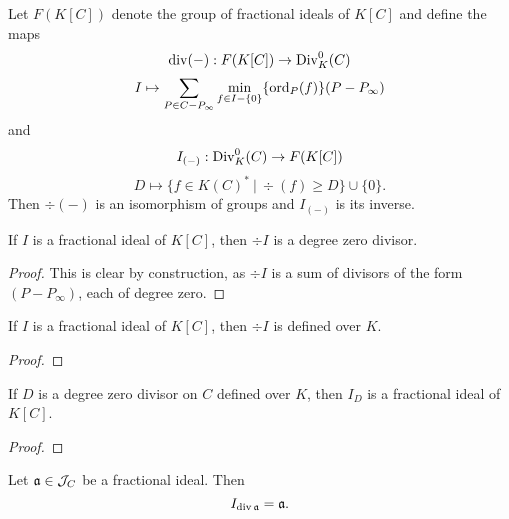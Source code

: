 \begin{theorem}
  Let $F(K[C])$ denote the group of fractional ideals of $K[C]$ and define the maps
  \[ \div(-) : F(K[C]) \to \Div_K^0(C) \]
  \[ I \mapsto \sum_{P \in C - P_\infty} \min_{f \in I - \{0\}}\{\ord_P(f)\}(P - P_\infty) \]
  and
  \[ I_{(-)} : \Div_K^0(C) \to F(K[C]) \]
  \[ D \mapsto \{ f \in K(C)^* ~|~ \div(f) \geq D \} \cup \{ 0 \}. \]
  Then $\div(-)$ is an isomorphism of groups and $I_{(-)}$ is its inverse.
\end{theorem}
\begin{lemma}
  If $I$ is a fractional ideal of $K[C]$, then $\div I$ is a degree zero divisor.
\end{lemma}
\begin{proof}
  This is clear by construction,
  as $\div I$ is a sum of divisors of the form $(P - P_\infty)$,
  each of degree zero.
\end{proof}
\begin{lemma}
  If $I$ is a fractional ideal of $K[C]$, then $\div I$ is defined over $K$.
\end{lemma}
\begin{proof}
\end{proof}
\begin{lemma}
  If $D$ is a degree zero divisor on $C$ defined over $K$,
  then $I_D$ is a fractional ideal of $K[C]$.
\end{lemma}
\begin{proof}
\end{proof}
\begin{lemma}
  Let $\frak a \in \cal J_C$ be a fractional ideal. Then
  \[ I_{\div \frak a} = \frak a. \]
\end{lemma}
